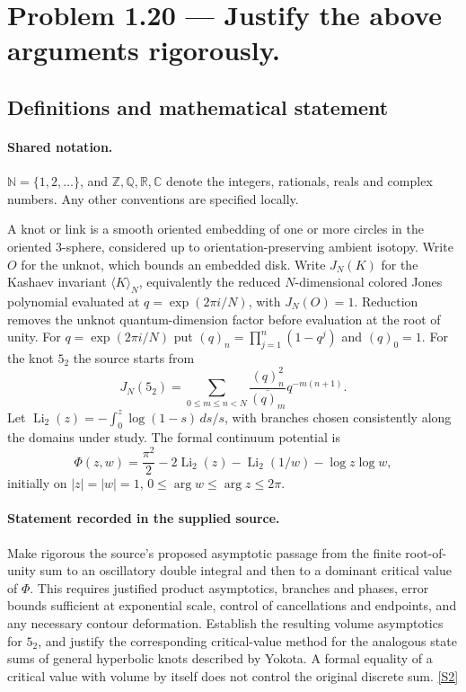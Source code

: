 \documentclass[11pt]{article}
\newcommand{\sref}[2]{\hyperlink{source:#1:#2}{[S#2]}}
\begin{document}
\section{Problem 1.20 — Justify the above arguments rigorously.}\label{statement}

\subsection{Definitions and mathematical statement}

\paragraph{Shared notation.}$\mathbb N=\{1,2,\ldots\}$, and $\mathbb Z,\mathbb Q,\mathbb R,\mathbb C$ denote the integers, rationals, reals and complex numbers. Any other conventions are specified locally.


A knot or link is a smooth oriented embedding of one or more circles in the oriented $3$-sphere, considered up to orientation-preserving ambient isotopy. Write $O$ for the unknot, which bounds an embedded disk. Write $J_N(K)$ for the Kashaev invariant $\langle K\rangle_N$, equivalently the reduced $N$-dimensional colored Jones polynomial evaluated at $q=\exp(2\pi i/N)$, with $J_N(O)=1$. Reduction removes the unknot quantum-dimension factor before evaluation at the root of unity. For $q=\exp(2\pi i/N)$ put $(q)_n=\prod_{j=1}^n(1-q^j)$ and $(q)_0=1$. For the knot $5_2$ the source starts from
\[J_N(5_2)=\sum_{0\le m\le n<N}\frac{(q)_n^2}{\overline{(q)_m}}q^{-m(n+1)}.\]
Let $\operatorname{Li}_2(z)=-\int_0^z\log(1-s)\,ds/s$, with branches chosen consistently along the domains under study. The formal continuum potential is
\[\Phi(z,w)=\frac{\pi^2}{2}-2\operatorname{Li}_2(z)-\operatorname{Li}_2(1/w)-\log z\log w,\]
initially on $|z|=|w|=1$, $0\le\arg w\le\arg z\le2\pi$.
\paragraph{Statement recorded in the supplied source.}
Make rigorous the source's proposed asymptotic passage from the finite root-of-unity sum to an oscillatory double integral and then to a dominant critical value of $\Phi$. This requires justified product asymptotics, branches and phases, error bounds sufficient at exponential scale, control of cancellations and endpoints, and any necessary contour deformation. Establish the resulting volume asymptotics for $5_2$, and justify the corresponding critical-value method for the analogous state sums of general hyperbolic knots described by Yokota. A formal equality of a critical value with volume by itself does not control the original discrete sum. \sref{statement}{2}
\end{document}
